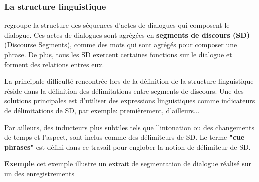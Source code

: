 \documentclass[a4paper,french]{article}
\begin{document}
\subsubsection{La structure linguistique} regroupe la structure des séquences d'actes de dialogues qui composent le dialogue. Ces actes de dialogues sont agrégées en \textbf{segments de discours (SD)} (Discourse Segments), comme des mots qui sont agrégés pour composer une phrase. De plus, tous les SD exercent certaines fonctions sur le dialogue et forment des relations entres eux.  
\par La principale difficulté rencontrée lors de la définition de la structure linguistique réside dans la définition des délimitations entre segments de discours. Une des solutions principales est d'utiliser des expressions linguistiques comme indicateurs de délimitations de SD, par exemple: premièrement, d'ailleurs... 
\par Par ailleurs, des inducteurs plus subtiles tels que l'intonation ou des changements de temps et l'aspect, sont inclus comme des délimiteurs de SD. Le terme \textbf{"cue phrases"} est défini dans ce travail pour englober la notion de délimiteur de SD. 

\textbf{Exemple} cet exemple illustre un extrait de segmentation de dialogue réalisé sur un des enregistrements

\begin{figure}
	\vskip 8pt
\end{figure}
\end{document}
